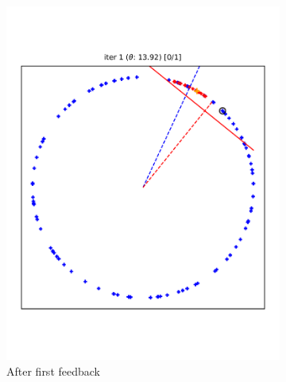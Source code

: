 \documentclass{article} %
\begin{document}
\begin{figure}
\begin{subfigure}{0.30\textwidth}
		\includegraphics[width=\textwidth, clip=true, trim=12mm 40mm 12mm 35mm]{iter_01}
		\caption{After first feedback}
		\label{fig:iter_01}
	\end{subfigure}
	\begin{subfigure}{0.30\textwidth}

\end{subfigure}
\end{figure}
\end{document}
